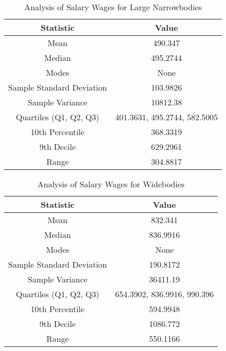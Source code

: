 \begin{table}[H]
    \centering
    \caption{Analysis of Salary Wages for Large Narrowbodies}
    \begin{tabular}{|c|c|}
        \hline
        Statistic                 & Value                        \\
        \hline
        Mean                      & 490.347                      \\
        Median                    & 495.2744                     \\
        Modes                     & None                         \\
        Sample Standard Deviation & 103.9826                     \\
        Sample Variance           & 10812.38                     \\
        Quartiles (Q1, Q2, Q3)    & 401.3631, 495.2744, 582.5005 \\
        10th Percentile           & 368.3319                     \\
        9th Decile                & 629.2961                     \\
        Range                     & 304.8817                     \\
        \hline
    \end{tabular}
\end{table}

\begin{table}[H]
    \centering
    \caption{Analysis of Salary Wages for Widebodies}
    \begin{tabular}{|c|c|}
        \hline
        Statistic                 & Value                       \\
        \hline
        Mean                      & 832.341                     \\
        Median                    & 836.9916                    \\
        Modes                     & None                        \\
        Sample Standard Deviation & 190.8172                    \\
        Sample Variance           & 36411.19                    \\
        Quartiles (Q1, Q2, Q3)    & 654.3902, 836.9916, 990.396 \\
        10th Percentile           & 594.9948                    \\
        9th Decile                & 1086.772                    \\
        Range                     & 550.1166                    \\
        \hline
    \end{tabular}
\end{table}

